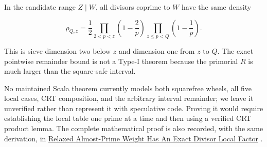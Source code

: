 In the candidate range $Z\mid W$, all divisors coprime to $W$ have the same
density

\begin{equation*}
\rho_{Q,z}
=
\frac12
\prod_{2\lt p\lt z}\left(1-\frac2p\right)
\prod_{z\le p\lt Q}\left(1-\frac1p\right).
\end{equation*}

This is sieve dimension two below $z$ and dimension one from $z$ to $Q$.
The exact pointwise remainder bound is not a Type-I theorem because the
primorial $R$ is much larger than the square-safe interval.

No maintained Scala theorem currently models both squarefree wheels, all five
local cases, CRT composition, and the arbitrary interval remainder; we leave
it unverified rather than represent it with speculative code. Proving it
would require establishing the local table one prime at a time and then
using a verified CRT product lemma. The complete mathematical proof
is also recorded, with the same derivation, in \href{https://github.com/thiagomata/prime-numbers/blob/master/properties/sieve-sequence/relaxed-almost-prime-divisor-local-factor.md}{Relaxed Almost-Prime Weight Has An Exact Divisor Local
Factor} \cite{divisorlocalfactor2026}.
